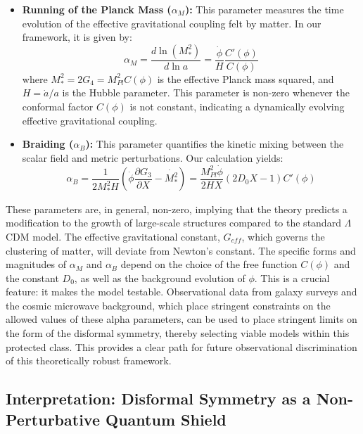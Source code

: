 \documentclass[twocolumn]{aastex631}
\begin{document}
\begin{itemize}
    \item \textbf{Running of the Planck Mass ($\alpha_M$):} This parameter measures the time evolution of the effective gravitational coupling felt by matter. In our framework, it is given by:
    \begin{equation}
    \alpha_M = \frac{d \ln(M_*^2)}{d \ln a} = \frac{\dot{\phi}}{H} \frac{C'(\phi)}{C(\phi)}
    \end{equation}
    where $M_*^2 = 2G_4 = M_{Pl}^2 C(\phi)$ is the effective Planck mass squared, and $H = \dot{a}/a$ is the Hubble parameter. This parameter is non-zero whenever the conformal factor $C(\phi)$ is not constant, indicating a dynamically evolving effective gravitational coupling.

    \item \textbf{Braiding ($\alpha_B$):} This parameter quantifies the kinetic mixing between the scalar field and metric perturbations. Our calculation yields:
    \begin{equation}
    \alpha_B = \frac{1}{2 M_*^2 H} \left( \dot{\phi} \frac{\partial G_3}{\partial X} - \dot{M_*^2} \right) = \frac{M_{Pl}^2 \dot{\phi}}{2HX} \left( 2D_0 X - 1 \right) C'(\phi)
    \end{equation}
\end{itemize}
These parameters are, in general, non-zero, implying that the theory predicts a modification to the growth of large-scale structures compared to the standard $\Lambda$CDM model. The effective gravitational constant, $G_{eff}$, which governs the clustering of matter, will deviate from Newton's constant. The specific forms and magnitudes of $\alpha_M$ and $\alpha_B$ depend on the choice of the free function $C(\phi)$ and the constant $D_0$, as well as the background evolution of $\phi$. This is a crucial feature: it makes the model testable. Observational data from galaxy surveys and the cosmic microwave background, which place stringent constraints on the allowed values of these alpha parameters, can be used to place stringent limits on the form of the disformal symmetry, thereby selecting viable models within this protected class. This provides a clear path for future observational discrimination of this theoretically robust framework.

\subsection{Interpretation: Disformal Symmetry as a Non-Perturbative Quantum Shield}
\end{document}
